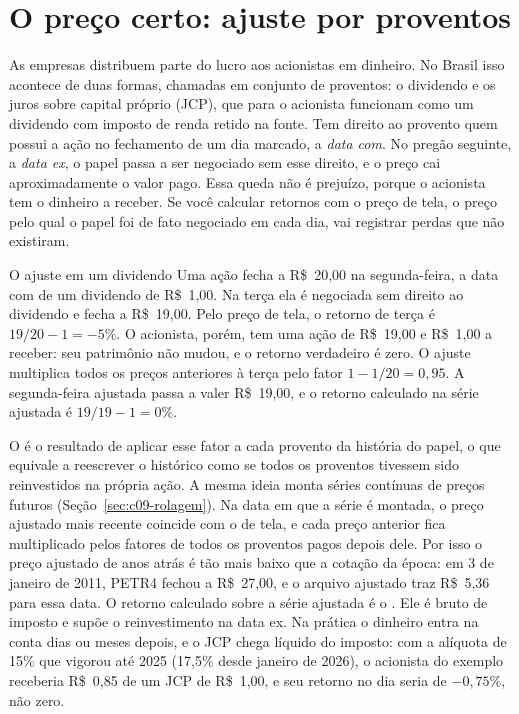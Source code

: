 \section{O preço certo: ajuste por proventos}
\label{sec:c01-proventos}

As empresas distribuem parte do lucro aos acionistas em dinheiro. No Brasil isso acontece de duas formas, chamadas em conjunto de proventos: o dividendo e os juros sobre capital próprio (JCP), que para o acionista funcionam como um dividendo com imposto de renda retido na fonte. Tem direito ao provento quem possui a ação no fechamento de um dia marcado, a \emph{data com}. No pregão seguinte, a \emph{data ex}, o papel passa a ser negociado sem esse direito, e o preço cai aproximadamente o valor pago. Essa queda não é prejuízo, porque o acionista tem o dinheiro a receber. Se você calcular retornos com o preço de tela, o preço pelo qual o papel foi de fato negociado em cada dia, vai registrar perdas que não existiram.

\Needspace{45mm}
\begin{exemplo}{O ajuste em um dividendo}
Uma ação fecha a R\$~20,00 na segunda-feira, a data com de um dividendo de R\$~1,00. Na terça ela é negociada sem direito ao dividendo e fecha a R\$~19,00. Pelo preço de tela, o retorno de terça é $19/20 - 1 = -5\%$. O acionista, porém, tem uma ação de R\$~19,00 e R\$~1,00 a receber: seu patrimônio não mudou, e o retorno verdadeiro é zero. O ajuste multiplica todos os preços anteriores à terça pelo fator $1 - 1/20 = 0,95$. A segunda-feira ajustada passa a valer R\$~19,00, e o retorno calculado na série ajustada é $19/19 - 1 = 0\%$.
\end{exemplo}

O  é o resultado de aplicar esse fator a cada provento da história do papel, o que equivale a reescrever o histórico como se todos os proventos tivessem sido reinvestidos na própria ação. A mesma ideia monta séries contínuas de preços futuros (Seção~\ref{sec:c09-rolagem}). Na data em que a série é montada, o preço ajustado mais recente coincide com o de tela, e cada preço anterior fica multiplicado pelos fatores de todos os proventos pagos depois dele. Por isso o preço ajustado de anos atrás é tão mais baixo que a cotação da época: em 3 de janeiro de 2011, PETR4 fechou a R\$~27,00, e o arquivo ajustado traz R\$~5,36 para essa data. O retorno calculado sobre a série ajustada é o . Ele é bruto de imposto e supõe o reinvestimento na data ex. Na prática o dinheiro entra na conta dias ou meses depois, e o JCP chega líquido do imposto: com a alíquota de 15\% que vigorou até 2025 (17,5\% desde janeiro de 2026), o acionista do exemplo receberia R\$~0,85 de um JCP de R\$~1,00, e seu retorno no dia seria de $-0,75\%$, não zero.

